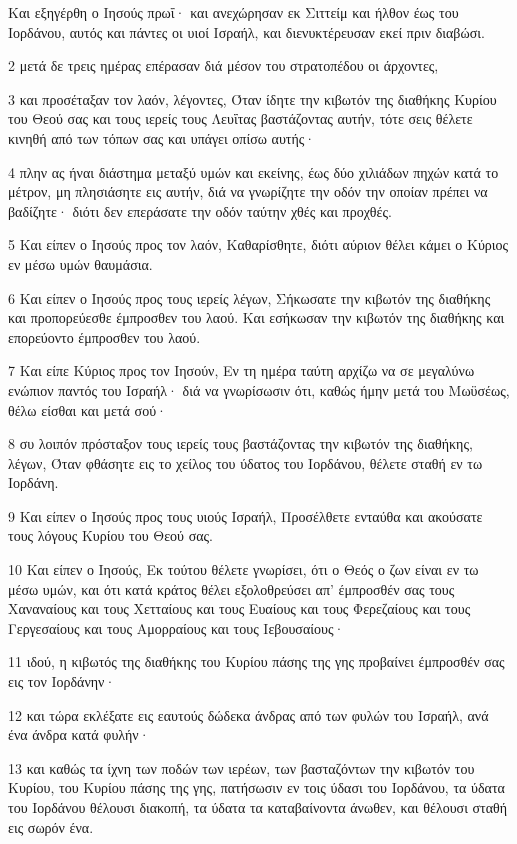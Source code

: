 \par Και εξηγέρθη ο Ιησούς πρωΐ· και ανεχώρησαν εκ Σιττείμ και ήλθον έως του Ιορδάνου, αυτός και πάντες οι υιοί Ισραήλ, και διενυκτέρευσαν εκεί πριν διαβώσι.
\par 2 μετά δε τρεις ημέρας επέρασαν διά μέσον του στρατοπέδου οι άρχοντες,
\par 3 και προσέταξαν τον λαόν, λέγοντες, Όταν ίδητε την κιβωτόν της διαθήκης Κυρίου του Θεού σας και τους ιερείς τους Λευΐτας βαστάζοντας αυτήν, τότε σεις θέλετε κινηθή από των τόπων σας και υπάγει οπίσω αυτής·
\par 4 πλην ας ήναι διάστημα μεταξύ υμών και εκείνης, έως δύο χιλιάδων πηχών κατά το μέτρον, μη πλησιάσητε εις αυτήν, διά να γνωρίζητε την οδόν την οποίαν πρέπει να βαδίζητε· διότι δεν επεράσατε την οδόν ταύτην χθές και προχθές.
\par 5 Και είπεν ο Ιησούς προς τον λαόν, Καθαρίσθητε, διότι αύριον θέλει κάμει ο Κύριος εν μέσω υμών θαυμάσια.
\par 6 Και είπεν ο Ιησούς προς τους ιερείς λέγων, Σήκωσατε την κιβωτόν της διαθήκης και προπορεύεσθε έμπροσθεν του λαού. Και εσήκωσαν την κιβωτόν της διαθήκης και επορεύοντο έμπροσθεν του λαού.
\par 7 Και είπε Κύριος προς τον Ιησούν, Εν τη ημέρα ταύτη αρχίζω να σε μεγαλύνω ενώπιον παντός του Ισραήλ· διά να γνωρίσωσιν ότι, καθώς ήμην μετά του Μωϋσέως, θέλω είσθαι και μετά σού·
\par 8 συ λοιπόν πρόσταξον τους ιερείς τους βαστάζοντας την κιβωτόν της διαθήκης, λέγων, Όταν φθάσητε εις το χείλος του ύδατος του Ιορδάνου, θέλετε σταθή εν τω Ιορδάνη.
\par 9 Και είπεν ο Ιησούς προς τους υιούς Ισραήλ, Προσέλθετε ενταύθα και ακούσατε τους λόγους Κυρίου του Θεού σας.
\par 10 Και είπεν ο Ιησούς, Εκ τούτου θέλετε γνωρίσει, ότι ο Θεός ο ζων είναι εν τω μέσω υμών, και ότι κατά κράτος θέλει εξολοθρεύσει απ' έμπροσθέν σας τους Χαναναίους και τους Χετταίους και τους Ευαίους και τους Φερεζαίους και τους Γεργεσαίους και τους Αμορραίους και τους Ιεβουσαίους·
\par 11 ιδού, η κιβωτός της διαθήκης του Κυρίου πάσης της γης προβαίνει έμπροσθέν σας εις τον Ιορδάνην·
\par 12 και τώρα εκλέξατε εις εαυτούς δώδεκα άνδρας από των φυλών του Ισραήλ, ανά ένα άνδρα κατά φυλήν·
\par 13 και καθώς τα ίχνη των ποδών των ιερέων, των βασταζόντων την κιβωτόν του Κυρίου, του Κυρίου πάσης της γης, πατήσωσιν εν τοις ύδασι του Ιορδάνου, τα ύδατα του Ιορδάνου θέλουσι διακοπή, τα ύδατα τα καταβαίνοντα άνωθεν, και θέλουσι σταθή εις σωρόν ένα.
